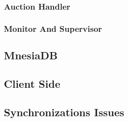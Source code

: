\subsubsection{Auction Handler}

\subsubsection{Monitor And Supervisor}

\subsection{MnesiaDB}

\subsection{Client Side}

\subsection{Synchronizations Issues}